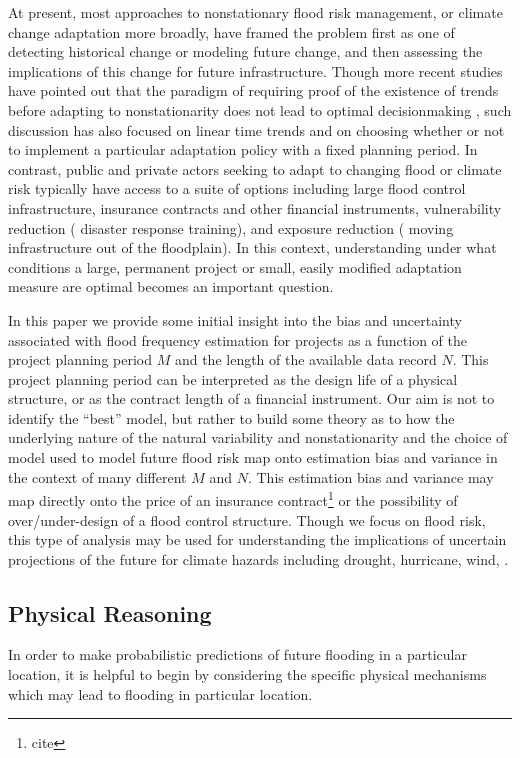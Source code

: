 \documentclass[12pt]{article}
\begin{document}
At present, most approaches to nonstationary flood risk management, or climate change adaptation more broadly, have framed the problem first as one of detecting historical change or modeling future change, and then assessing the implications of this change for future infrastructure.
Though more recent studies have pointed out that the paradigm of requiring proof of the existence of trends before adapting to nonstationarity does not lead to optimal decisionmaking \citep{Vogel2013,Rosner2014}, such discussion has also focused on linear time trends and on choosing whether or not to implement a particular adaptation policy with a fixed planning period.
In contrast, public and private actors seeking to adapt to changing flood or climate risk typically have access to a suite of options including large flood control infrastructure, insurance contracts and other financial instruments, vulnerability reduction (\ie{} disaster response training), and exposure reduction (\ie{} moving infrastructure out of the floodplain).
In this context, understanding under what conditions a large, permanent project or small, easily modified adaptation measure are optimal becomes an important question.

In this paper we provide some initial insight into the bias and uncertainty associated with flood frequency estimation for projects as a function of the project planning period \(M\) and the length of the available data record \(N\).
This project planning period can be interpreted as the design life of a physical structure, or as the contract length of a financial instrument.
Our aim is not to identify the ``best'' model, but rather to build some theory as to how the underlying nature of the natural variability and nonstationarity and the choice of model used to model future flood risk map onto estimation bias and variance in the context of many different \(M\) and \(N\).
This estimation bias and variance may map directly onto the price of an insurance contract\footnote{cite} or the possibility of over/under-design of a flood control structure.
Though we focus on flood risk, this type of analysis may be used for understanding the implications of uncertain projections of the future for climate hazards including drought, hurricane, wind, \etc{}.

\subsection{Physical Reasoning}

In order to make probabilistic predictions of future flooding in a particular location, it is helpful to begin by considering the specific physical mechanisms which may lead to flooding in particular location.
\end{document}
